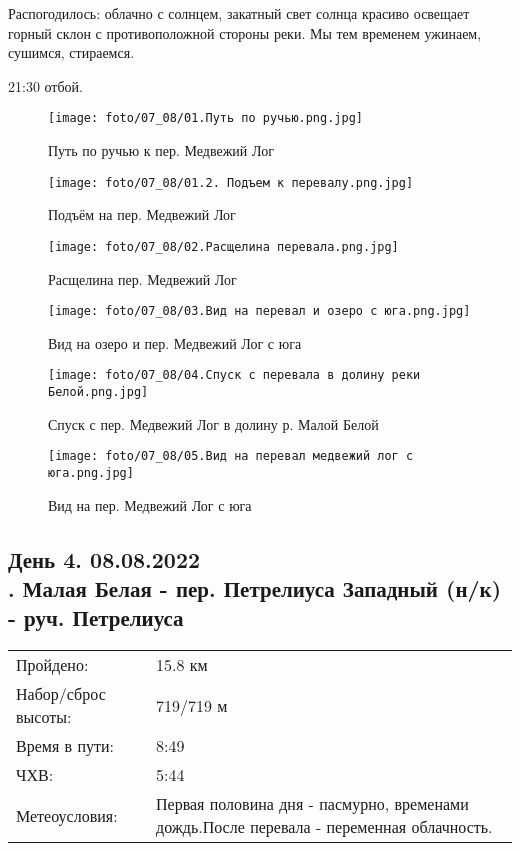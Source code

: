 Распогодилось: облачно с солнцем, закатный свет солнца красиво освещает горный склон с противоположной стороны реки.
Мы тем временем ужинаем, сушимся, стираемся.

21:30 отбой.

\begin{figure}
    \centering
    \texttt{[image: foto/07\_08/01.Путь по ручью.png.jpg]}
    \caption{Путь по ручью к пер. Медвежий Лог}
\end{figure}

\begin{figure}
    \centering
    \texttt{[image: foto/07\_08/01.2. Подъем к перевалу.png.jpg]}
    \caption{Подъём на пер. Медвежий Лог}
\end{figure}

\begin{figure}
    \centering
    \texttt{[image: foto/07\_08/02.Расщелина перевала.png.jpg]}
    \caption{Расщелина пер. Медвежий Лог}
\end{figure}

\begin{figure}
    \centering
    \texttt{[image: foto/07\_08/03.Вид на перевал и озеро с юга.png.jpg]}
    \caption{Вид на озеро и пер. Медвежий Лог с юга}
\end{figure}

\begin{figure}
    \centering
    \texttt{[image: foto/07\_08/04.Спуск с перевала в долину реки Белой.png.jpg]}
    \caption{Спуск с пер. Медвежий Лог в долину р. Малой Белой}
\end{figure}

\begin{figure}[H]
    \centering
    \texttt{[image: foto/07\_08/05.Вид на перевал медвежий лог с юга.png.jpg]}
    \caption{Вид на пер. Медвежий Лог с юга}
\end{figure}

\subsection{День 4. 08.08.2022\\
. Малая Белая - пер. Петрелиуса Западный (н/к) - руч. Петрелиуса}
\begin{tabular}{l p{12cm}}
\hline
Пройдено: & 15.8 км\\
Набор/сброс высоты: & 719/719 м\\
Время в пути: & 8:49\\
ЧХВ: & 5:44\\
Метеоусловия: & Первая половина дня - пасмурно, временами дождь.\hfill \break После перевала - переменная облачность.\\
\hline
\end{tabular}\\

